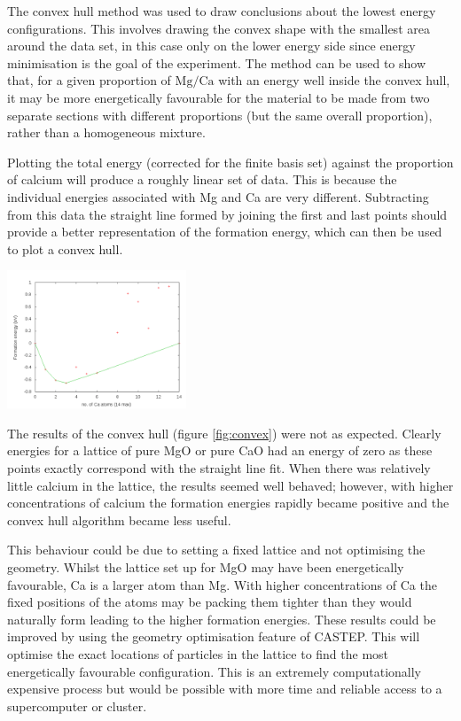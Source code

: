 \documentclass[a4paper,12pt]{article}
\begin{document}
\begin{multicols}{2}
	The convex hull method\cite{jarvis1973identification} was used to draw conclusions about the lowest energy configurations. This involves drawing the convex shape with the smallest area around the data set, in this case only on the lower energy side since energy minimisation is the goal of the experiment. The method can be used to show that, for a given proportion of $\mathrm{Mg}/\mathrm{Ca}$ with an energy well inside the convex hull, it may be more energetically favourable for the material to be made from two separate sections with different proportions (but the same overall proportion), rather than a homogeneous mixture.
	
	Plotting the total energy (corrected for the finite basis set) against the proportion of calcium will produce a roughly linear set of data. This is because the individual energies associated with Mg and Ca are very different. Subtracting from this data the straight line formed by joining the first and last points should provide a better representation of the formation energy, which can then be used to plot a convex hull.
    \begin{center}
	    \includegraphics[keepaspectratio=true,width=0.4\textwidth]{convex}
		\label{fig:convex} 
	\end{center}
    The results of the convex hull (figure \ref{fig:convex}) were not as expected.  Clearly energies for a lattice of pure MgO or pure CaO had an energy of zero as these points exactly correspond with the straight line fit. When there was relatively little calcium in the lattice, the results seemed well behaved; however, with higher concentrations of calcium the formation energies rapidly became positive and the convex hull algorithm became less useful.   
    
    This behaviour could be due to setting a fixed lattice and not optimising the geometry. Whilst the lattice set up for MgO may have been energetically favourable, Ca is a larger atom than Mg. With higher concentrations of Ca the fixed positions of the atoms may be packing them tighter than they would naturally form leading to the higher formation energies. These results could be improved by using the geometry optimisation feature of CASTEP. This will optimise the exact locations of particles in the lattice to find the most energetically favourable configuration. This is  an extremely computationally expensive process but would be possible with more time and reliable access to a supercomputer or cluster.
    

\end{multicols}
\end{document}
